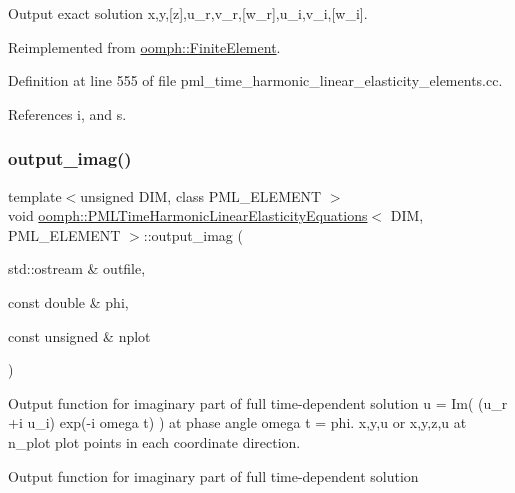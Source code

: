 Output exact solution x,y,\mbox{[}z\mbox{]},u\+\_\+r,v\+\_\+r,\mbox{[}w\+\_\+r\mbox{]},u\+\_\+i,v\+\_\+i,\mbox{[}w\+\_\+i\mbox{]}. 



Reimplemented from \hyperlink{classoomph_1_1FiniteElement_a22b695c714f60ee6cd145be348042035}{oomph\+::\+Finite\+Element}.



Definition at line 555 of file pml\+\_\+time\+\_\+harmonic\+\_\+linear\+\_\+elasticity\+\_\+elements.\+cc.



References i, and s.

\mbox{\label{classoomph_1_1PMLTimeHarmonicLinearElasticityEquations_a79883a8a8d133f4b932734b45aab2d49}} 
\subsubsection{\texorpdfstring{output\+\_\+imag()}{output\_imag()}}
{\footnotesize\ttfamily template$<$unsigned D\+IM, class P\+M\+L\+\_\+\+E\+L\+E\+M\+E\+NT $>$ \\
void \hyperlink{classoomph_1_1PMLTimeHarmonicLinearElasticityEquations}{oomph\+::\+P\+M\+L\+Time\+Harmonic\+Linear\+Elasticity\+Equations}$<$ D\+IM, P\+M\+L\+\_\+\+E\+L\+E\+M\+E\+NT $>$\+::output\+\_\+imag (\begin{DoxyParamCaption}\item[{std\+::ostream \&}]{outfile,  }\item[{const double \&}]{phi,  }\item[{const unsigned \&}]{nplot }\end{DoxyParamCaption})}



Output function for imaginary part of full time-\/dependent solution u = Im( (u\+\_\+r +i u\+\_\+i) exp(-\/i omega t) ) at phase angle omega t = phi. x,y,u or x,y,z,u at n\+\_\+plot plot points in each coordinate direction. 

Output function for imaginary part of full time-\/dependent solution

